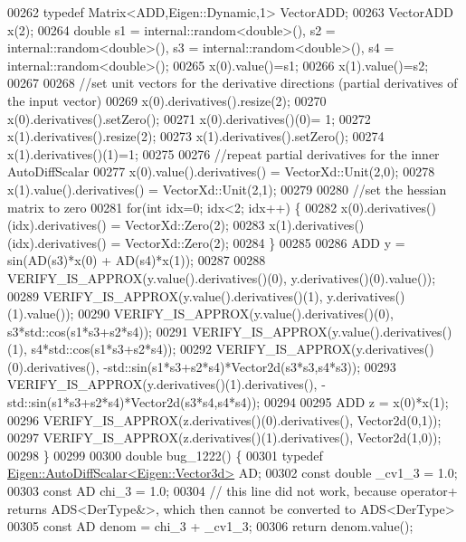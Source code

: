 \begin{DoxyCode}
00262   \textcolor{keyword}{typedef} Matrix<ADD,Eigen::Dynamic,1> VectorADD;
00263   VectorADD x(2);
00264   \textcolor{keywordtype}{double} s1 = internal::random<double>(), s2 = internal::random<double>(), s3 = internal::random<double>(),
       s4 = internal::random<double>();
00265   x(0).value()=s1;
00266   x(1).value()=s2;
00267 
00268   \textcolor{comment}{//set unit vectors for the derivative directions (partial derivatives of the input vector)}
00269   x(0).derivatives().resize(2);
00270   x(0).derivatives().setZero();
00271   x(0).derivatives()(0)= 1;
00272   x(1).derivatives().resize(2);
00273   x(1).derivatives().setZero();
00274   x(1).derivatives()(1)=1;
00275 
00276   \textcolor{comment}{//repeat partial derivatives for the inner AutoDiffScalar}
00277   x(0).value().derivatives() = VectorXd::Unit(2,0);
00278   x(1).value().derivatives() = VectorXd::Unit(2,1);
00279 
00280   \textcolor{comment}{//set the hessian matrix to zero}
00281   \textcolor{keywordflow}{for}(\textcolor{keywordtype}{int} idx=0; idx<2; idx++) \{
00282       x(0).derivatives()(idx).derivatives()  = VectorXd::Zero(2);
00283       x(1).derivatives()(idx).derivatives()  = VectorXd::Zero(2);
00284   \}
00285 
00286   ADD y = sin(AD(s3)*x(0) + AD(s4)*x(1));
00287 
00288   VERIFY\_IS\_APPROX(y.value().derivatives()(0), y.derivatives()(0).value());
00289   VERIFY\_IS\_APPROX(y.value().derivatives()(1), y.derivatives()(1).value());
00290   VERIFY\_IS\_APPROX(y.value().derivatives()(0), s3*std::cos(s1*s3+s2*s4));
00291   VERIFY\_IS\_APPROX(y.value().derivatives()(1), s4*std::cos(s1*s3+s2*s4));
00292   VERIFY\_IS\_APPROX(y.derivatives()(0).derivatives(), -std::sin(s1*s3+s2*s4)*Vector2d(s3*s3,s4*s3));
00293   VERIFY\_IS\_APPROX(y.derivatives()(1).derivatives(),  -std::sin(s1*s3+s2*s4)*Vector2d(s3*s4,s4*s4));
00294 
00295   ADD z = x(0)*x(1);
00296   VERIFY\_IS\_APPROX(z.derivatives()(0).derivatives(), Vector2d(0,1));
00297   VERIFY\_IS\_APPROX(z.derivatives()(1).derivatives(), Vector2d(1,0));
00298 \}
00299 
00300 \textcolor{keywordtype}{double} bug\_1222() \{
00301   \textcolor{keyword}{typedef} \hyperlink{class_eigen_1_1_auto_diff_scalar}{Eigen::AutoDiffScalar<Eigen::Vector3d>} AD;
00302   \textcolor{keyword}{const} \textcolor{keywordtype}{double} \_cv1\_3 = 1.0;
00303   \textcolor{keyword}{const} AD chi\_3 = 1.0;
00304   \textcolor{comment}{// this line did not work, because operator+ returns ADS<DerType&>, which then cannot be converted to
       ADS<DerType>}
00305   \textcolor{keyword}{const} AD denom = chi\_3 + \_cv1\_3;
00306   \textcolor{keywordflow}{return} denom.value();

\end{DoxyCode}
